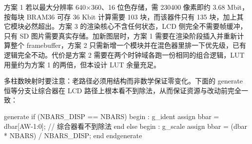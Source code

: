 \documentclass[withoutpreface,bwprint]{cumcmthesis}
\begin{document}
\begin{tcolorbox}[title=\textbf{AI 回答要点}, colback=green!2!white,
                  colframe=green!30!black, fonttitle=\bfseries, breakable]
方案 1 若以最大分辨率 640×360、16 位色存储，需 230400 像素即约 3.68 Mbit，按每块 BRAM36 可存 36 Kbit 计算需要 103 块，而该器件只有 135 块，加上其它模块必然超出。方案 3 的渲染核心不含任何状态，LCD 侧完全不需要帧缓冲，只有 SD 图片需要真实存储。加新图层时，方案 1 需要在渲染阶段插入并重新计算整个 framebuffer，方案 2 只需新增一个模块并在混色器里排一下优先级，已有逻辑完全不动。代价是方案 2 需要在两个时钟域各跑一份相同的组合逻辑，LUT 用量约为方案 1 的两倍，但本设计 LUT 余量充足。

多柱数映射时要注意：老路径必须用结构而非数学保证零变化。下面的 generate 恒等分支让综合器在 LCD 路径上根本看不到除法，从而保证资源与改动前完全一致：

\begin{ai_verilog}
generate
    if (NBARS_DISP == NBARS) begin : g_ident
        assign bbar = dbar[AW-1:0];            // 综合器看不到除法
    end else begin : g_scale
        assign bbar = (dbar * NBARS) / NBARS_DISP;
    end
endgenerate
\end{ai_verilog}
\end{tcolorbox}


%
%
\end{document}
